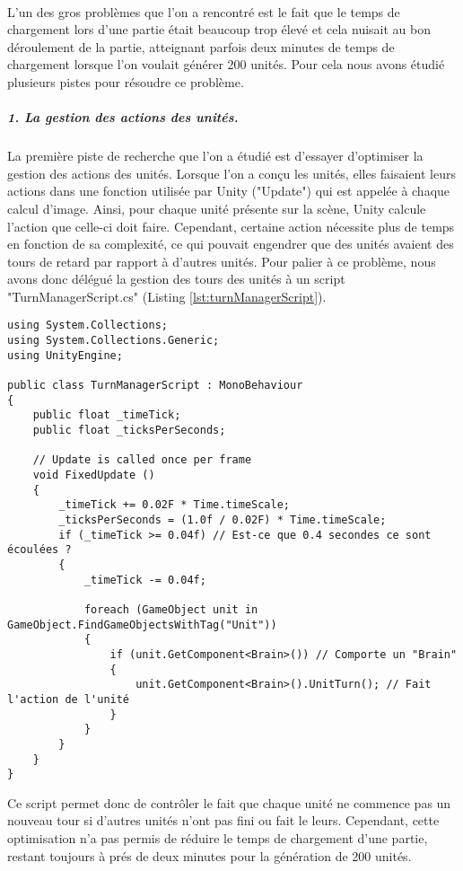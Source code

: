 \documentclass{report}
\begin{document}
\paragraph{} L'un des gros problèmes que l'on a rencontré est le fait que le temps de chargement lors d'une partie était beaucoup trop élevé et cela nuisait au bon déroulement de la partie, atteignant parfois deux minutes de temps de chargement lorsque l'on voulait générer 200 unités. Pour cela nous avons étudié plusieurs pistes pour résoudre ce problème.
\subparagraph{1. La gestion des actions des unités.}La première piste de recherche que l'on a étudié est d'essayer d'optimiser la gestion des actions des unités. Lorsque l'on a conçu les unités, elles faisaient leurs actions dans une fonction utilisée par Unity ("Update") qui est appelée à chaque calcul d'image. Ainsi, pour chaque unité présente sur la scène, Unity calcule l'action que celle-ci doit faire. Cependant, certaine action nécessite plus de temps en fonction de sa complexité, ce qui pouvait engendrer que des unités avaient des tours de retard par rapport à d'autres unités. \newline
Pour palier à ce problème, nous avons donc délégué la gestion des tours des unités à un script  "TurnManagerScript.cs" (Listing \ref{lst:turnManagerScript}).\newline
 \begin{lstlisting}[language={[Sharp]C},label={lst:turnManagerScript}, caption= Code du script TurnManagerScript.cs]
using System.Collections;
using System.Collections.Generic;
using UnityEngine;

public class TurnManagerScript : MonoBehaviour
{
    public float _timeTick;
    public float _ticksPerSeconds;
    
    // Update is called once per frame
	void FixedUpdate ()
    {
        _timeTick += 0.02F * Time.timeScale;
        _ticksPerSeconds = (1.0f / 0.02F) * Time.timeScale;
        if (_timeTick >= 0.04f) // Est-ce que 0.4 secondes ce sont écoulées ?
        {
            _timeTick -= 0.04f;

            foreach (GameObject unit in GameObject.FindGameObjectsWithTag("Unit"))
            {
                if (unit.GetComponent<Brain>()) // Comporte un "Brain"
                {
                    unit.GetComponent<Brain>().UnitTurn(); // Fait l'action de l'unité
                }
            }
        }
	}
}
\end{lstlisting}
Ce script permet donc de contrôler le fait que chaque unité ne commence pas un nouveau tour si d'autres unités n'ont pas fini ou fait le leurs.
Cependant, cette optimisation n'a pas permis de réduire le temps de chargement d'une partie, restant toujours à prés de deux minutes pour la génération de 200 unités.
\end{document}
